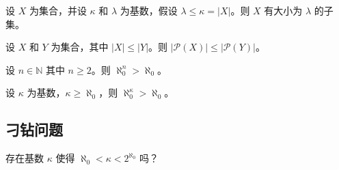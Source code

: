 \begin{chapex} %
设 $X$ 为集合，并设 $\kappa$ 和 $\lambda$ 为基数，假设 $\lambda \le \kappa = |X|$。则 $X$ 有大小为 $\lambda$ 的子集。
\end{chapex}

\begin{chapex} %
设 $X$ 和 $Y$ 为集合，其中 $|X| \le |Y|$。则 $|\mathcal{P}(X)| \le |\mathcal{P}(Y)|$。
\end{chapex}

\begin{chapex} %
设 $n \in \mathbb{N}$ 其中 $n \ge 2$。则 $\aleph_0^n > \aleph_0$。
\end{chapex}

\begin{chapex} %
\label{cqInfinityASNEnd}
设 $\kappa$ 为基数，$\kappa \ge \aleph_0$，则 $\aleph_0^{\kappa} > \aleph_0$。
\end{chapex}

\subsection*{刁钻问题}

\begin{chapex}
存在基数 $\kappa$ 使得 $\aleph_0 < \kappa < 2^{\aleph_0}$ 吗？
\end{chapex}
